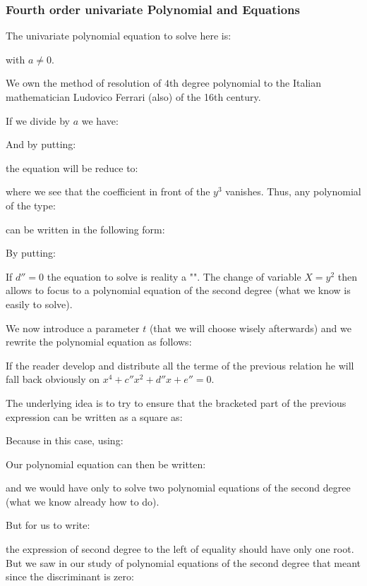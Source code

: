 	\subsubsection{Fourth order univariate Polynomial and Equations}
	The univariate polynomial equation to solve here is:
	
	with $a\neq 0$.
	\begin{tcolorbox}[title=Remark,colframe=black,arc=10pt]
	We own the method of resolution of $4$th degree polynomial to the Italian mathematician  Ludovico Ferrari (also) of the 16th century.
	\end{tcolorbox}
	If we divide by $a$ we have:
	
	And by putting:
	
	the equation will be reduce to:
	
	where we see that the coefficient in front of the $y^3$ vanishes. Thus, any polynomial of the type:
	
	can be written in the following form:
	
	By putting:
	
	\begin{tcolorbox}[title=Remark,colframe=black,arc=10pt]
	If $d''=0$ the equation to solve is reality a "". The change of variable $X=y^2$ then allows to focus to a polynomial equation of the second degree (what we know is easily to solve).
	\end{tcolorbox}
	We now introduce a parameter $t$ (that we will choose wisely afterwards) and we rewrite the polynomial equation as follows:
	
	\begin{tcolorbox}[title=Remark,colframe=black,arc=10pt]
	If the reader develop and distribute all the terme of the previous relation he will fall back obviously on $x^4+c''x^2+d''x+e''=0$.
	\end{tcolorbox}
	The underlying idea is to try to ensure that the bracketed part of the previous expression can be written as a square as:
	
	Because in this case, using:
	
	Our polynomial equation can then be written:
	
	and we would have only to solve two polynomial equations of the second degree (what we know already how to do).
	
	But for us to write:
	
	the expression of second degree to the left of equality should have only one root. But we saw in our study of polynomial equations of the second degree that meant since the discriminant is zero:
	
